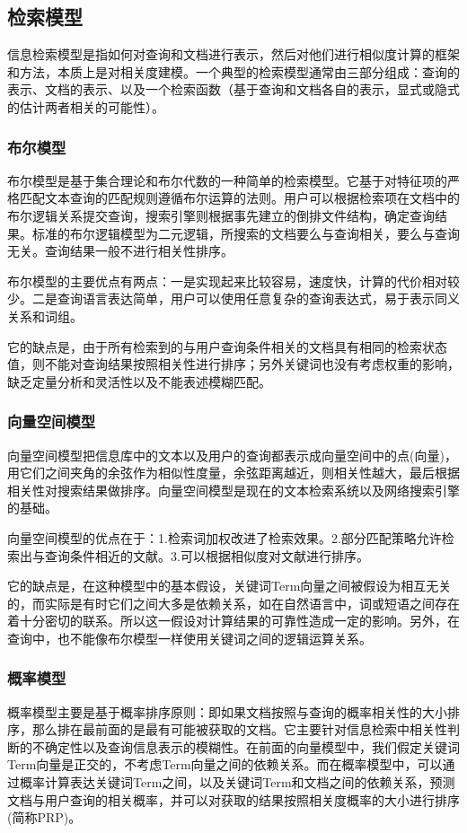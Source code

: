 \documentclass[a4paper]{article}
\begin{document}
\subsection{检索模型}
信息检索模型是指如何对查询和文档进行表示，然后对他们进行相似度计算的框架和方法，本质上是对相关度建模。一个典型的检索模型通常由三部分组成：查询的表示、文档的表示、以及一个检索函数（基于查询和文档各自的表示，显式或隐式的估计两者相关的可能性）。

\subsubsection{布尔模型}
布尔模型是基于集合理论和布尔代数的一种简单的检索模型。它基于对特征项的严格匹配文本查询的匹配规则遵循布尔运算的法则。用户可以根据检索项在文档中的布尔逻辑关系提交查询，搜索引擎则根据事先建立的倒排文件结构，确定查询结果。标准的布尔逻辑模型为二元逻辑，所搜索的文档要么与查询相关，要么与查询无关。查询结果一般不进行相关性排序。

布尔模型的主要优点有两点：一是实现起来比较容易，速度快，计算的代价相对较少。二是查询语言表达简单，用户可以使用任意复杂的查询表达式，易于表示同义关系和词组。

它的缺点是，由于所有检索到的与用户查询条件相关的文档具有相同的检索状态值，则不能对查询结果按照相关性进行排序；另外关键词也没有考虑权重的影响，缺乏定量分析和灵活性以及不能表述模糊匹配。

\subsubsection{向量空间模型}
向量空间模型把信息库中的文本以及用户的查询都表示成向量空间中的点(向量)，用它们之间夹角的余弦作为相似性度量，余弦距离越近，则相关性越大，最后根据相关性对搜索结果做排序。向量空间模型是现在的文本检索系统以及网络搜索引擎的基础。

向量空间模型的优点在于：1.检索词加权改进了检索效果。2.部分匹配策略允许检索出与查询条件相近的文献。3.可以根据相似度对文献进行排序。

它的缺点是，在这种模型中的基本假设，关键词Term向量之间被假设为相互无关的，而实际是有时它们之间大多是依赖关系，如在自然语言中，词或短语之间存在着十分密切的联系。所以这一假设对计算结果的可靠性造成一定的影响。另外，在查询中，也不能像布尔模型一样使用关键词之间的逻辑运算关系。

\subsubsection{概率模型}
概率模型主要是基于概率排序原则：即如果文档按照与查询的概率相关性的大小排序，那么排在最前面的是最有可能被获取的文档。它主要针对信息检索中相关性判断的不确定性以及查询信息表示的模糊性。在前面的向量模型中，我们假定关键词Term向量是正交的，不考虑Term向量之间的依赖关系。而在概率模型中，可以通过概率计算表达关键词Term之间，以及关键词Term和文档之间的依赖关系，预测文档与用户查询的相关概率，并可以对获取的结果按照相关度概率的大小进行排序(简称PRP)。
\end{document}
